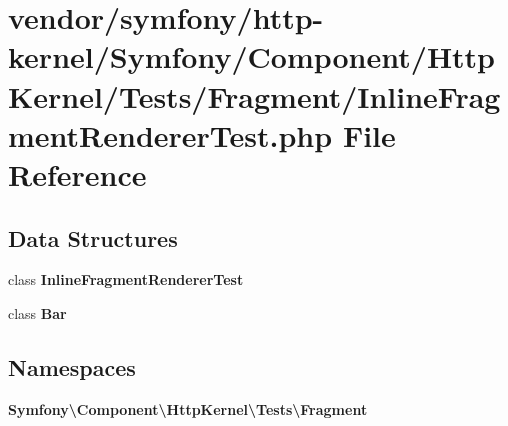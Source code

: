 \section{vendor/symfony/http-\/kernel/\+Symfony/\+Component/\+Http\+Kernel/\+Tests/\+Fragment/\+Inline\+Fragment\+Renderer\+Test.php File Reference}
\label{_inline_fragment_renderer_test_8php}
\subsection*{Data Structures}
\begin{DoxyCompactItemize}
\item 
class {\bf Inline\+Fragment\+Renderer\+Test}
\item 
class {\bf Bar}
\end{DoxyCompactItemize}
\subsection*{Namespaces}
\begin{DoxyCompactItemize}
\item 
 {\bf Symfony\textbackslash{}\+Component\textbackslash{}\+Http\+Kernel\textbackslash{}\+Tests\textbackslash{}\+Fragment}
\end{DoxyCompactItemize}
